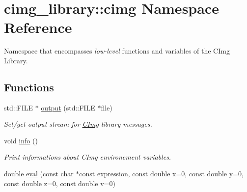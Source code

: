 \hypertarget{namespacecimg__library_1_1cimg}{
\section{cimg\_\-library::cimg Namespace Reference}
\label{namespacecimg__library_1_1cimg}
}


Namespace that encompasses {\itshape low-\/level\/} functions and variables of the CImg Library.  


\subsection*{Functions}
\begin{DoxyCompactItemize}
\item 
\hypertarget{namespacecimg__library_1_1cimg_a4947bf6e604e2f8e4a58b3ad19247443}{
std::FILE $\ast$ \hyperlink{namespacecimg__library_1_1cimg_a4947bf6e604e2f8e4a58b3ad19247443}{output} (std::FILE $\ast$file)}
\label{namespacecimg__library_1_1cimg_a4947bf6e604e2f8e4a58b3ad19247443}

\begin{DoxyCompactList}\small\item\em Set/get output stream for \hyperlink{structcimg__library_1_1CImg}{CImg} library messages. \item\end{DoxyCompactList}\item 
void \hyperlink{namespacecimg__library_1_1cimg_ac1b66fe77173de9e5e8542b2823d6071}{info} ()
\begin{DoxyCompactList}\small\item\em Print informations about CImg environement variables. \item\end{DoxyCompactList}\item 
\hypertarget{namespacecimg__library_1_1cimg_a7aba6b3a2c6cfb7aeccd4ac1977830c5}{
double \hyperlink{namespacecimg__library_1_1cimg_a7aba6b3a2c6cfb7aeccd4ac1977830c5}{eval} (const char $\ast$const expression, const double x=0, const double y=0, const double z=0, const double v=0)}
\label{namespacecimg__library_1_1cimg_a7aba6b3a2c6cfb7aeccd4ac1977830c5}


\end{DoxyCompactItemize}
